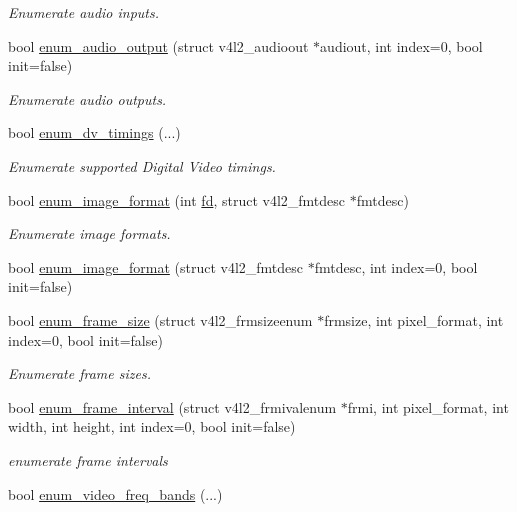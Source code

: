 \begin{DoxyCompactItemize}
\begin{DoxyCompactList}\small\item\em Enumerate audio inputs. \end{DoxyCompactList}\item 
bool \hyperlink{classv4lcap_a7a34a4f4c08c561059982b727e607bac}{enum\+\_\+audio\+\_\+output} (struct v4l2\+\_\+audioout $\ast$audiout, int index=0, bool init=false)
\begin{DoxyCompactList}\small\item\em Enumerate audio outputs. \end{DoxyCompactList}\item 
bool \hyperlink{classv4lcap_ae798bdeaf8df06318f30140fe5a2af72}{enum\+\_\+dv\+\_\+timings} (...)
\begin{DoxyCompactList}\small\item\em Enumerate supported Digital Video timings. \end{DoxyCompactList}\item 
bool \hyperlink{classv4lcap_a4f5a8ccdd2a75e9d2f2d4d541fdb84dd}{enum\+\_\+image\+\_\+format} (int \hyperlink{classv4lcap_a38109593bde997dad13b3a461569573d}{fd}, struct v4l2\+\_\+fmtdesc $\ast$fmtdesc)
\begin{DoxyCompactList}\small\item\em Enumerate image formats. \end{DoxyCompactList}\item 
bool \hyperlink{classv4lcap_aafc2292c8ca86a45d42874ed4ca1c467}{enum\+\_\+image\+\_\+format} (struct v4l2\+\_\+fmtdesc $\ast$fmtdesc, int index=0, bool init=false)
\item 
bool \hyperlink{classv4lcap_a6b806d7b2bfce38081f71fe01f380f6f}{enum\+\_\+frame\+\_\+size} (struct v4l2\+\_\+frmsizeenum $\ast$frmsize, int pixel\+\_\+format, int index=0, bool init=false)
\begin{DoxyCompactList}\small\item\em Enumerate frame sizes. \end{DoxyCompactList}\item 
bool \hyperlink{classv4lcap_af4e34a5583945f2d24dd0cb298b5e191}{enum\+\_\+frame\+\_\+interval} (struct v4l2\+\_\+frmivalenum $\ast$frmi, int pixel\+\_\+format, int width, int height, int index=0, bool init=false)
\begin{DoxyCompactList}\small\item\em enumerate frame intervals \end{DoxyCompactList}\item 
bool \hyperlink{classv4lcap_a16a988e0ba3bce064c88d17d54551821}{enum\+\_\+video\+\_\+freq\+\_\+bands} (...)

\end{DoxyCompactItemize}

